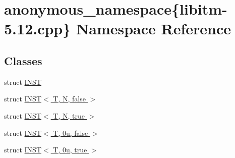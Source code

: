 \hypertarget{namespaceanonymous__namespace_02libitm-5_812_8cpp_03}{\section{anonymous\-\_\-namespace\{libitm-\/5.12.cpp\} Namespace Reference}
\label{namespaceanonymous__namespace_02libitm-5_812_8cpp_03}
}
\subsection*{Classes}
\begin{DoxyCompactItemize}
\item 
struct \hyperlink{structanonymous__namespace_02libitm-5_812_8cpp_03_1_1INST}{I\-N\-S\-T}
\item 
struct \hyperlink{structanonymous__namespace_02libitm-5_812_8cpp_03_1_1INST_3_01T_00_01N_00_01false_01_4}{I\-N\-S\-T$<$ T, N, false $>$}
\item 
struct \hyperlink{structanonymous__namespace_02libitm-5_812_8cpp_03_1_1INST_3_01T_00_01N_00_01true_01_4}{I\-N\-S\-T$<$ T, N, true $>$}
\item 
struct \hyperlink{structanonymous__namespace_02libitm-5_812_8cpp_03_1_1INST_3_01T_00_010u_00_01false_01_4}{I\-N\-S\-T$<$ T, 0u, false $>$}
\item 
struct \hyperlink{structanonymous__namespace_02libitm-5_812_8cpp_03_1_1INST_3_01T_00_010u_00_01true_01_4}{I\-N\-S\-T$<$ T, 0u, true $>$}
\end{DoxyCompactItemize}
